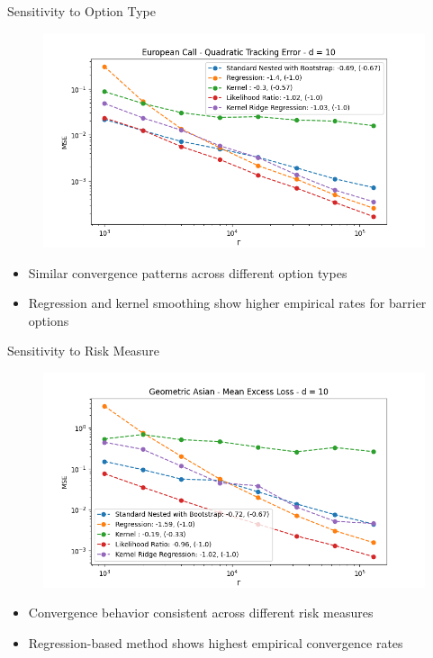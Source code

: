 \documentclass[9pt,handout]{beamer}
\begin{document}
\begin{frame}{Sensitivity to Option Type}

\begin{figure}
    \includegraphics[width=\textwidth]{../project1/figures/figure6a.png}
\end{figure}

\begin{itemize}
    \item Similar convergence patterns across different option types
    \item Regression and kernel smoothing show higher empirical rates for barrier options
\end{itemize}

\end{frame}

\begin{frame}{Sensitivity to Risk Measure}

\begin{figure}
    \includegraphics[width=\textwidth]{../project1/figures/figure8a.png}
\end{figure}

\begin{itemize}
    \item Convergence behavior consistent across different risk measures
    \item Regression-based method shows highest empirical convergence rates
\end{itemize}

\end{frame}
\end{document}
